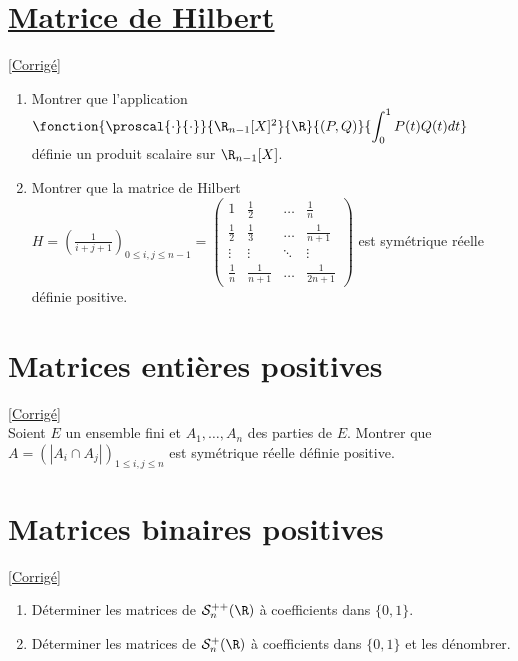 \documentclass[8pt]{book}
\begin{document}
\section{\underline{Matrice de Hilbert} }
\label{Matrice de Hilbert}
\textcolor{blue}{\hyperref[Matrice de Hilbert corrigé]{[Corrigé]}}\\
\begin{enumerate}
	\item Montrer que l'application $\fonction{\proscal{\cdot}{\cdot}}{\R_{n-1}[X]^2}{\R}{(P,Q)}{\displaystyle\int_0^1P(t)Q(t)dt}$ définie un produit scalaire sur $\R_{n-1}[X]$.
	\item Montrer que la matrice de Hilbert $H=\displaystyle\left(\frac{1}{i+j+1}\right)_{0\leq i,j\leq n-1}=
	\begin{pmatrix}
		1&\displaystyle\frac{1}{2}&\dots&\displaystyle\frac{1}{n}\\
		\displaystyle\frac{1}{2}&\displaystyle\frac{1}{3}&\dots&\displaystyle\frac{1}{n+1}\\
		\vdots&\vdots&\ddots&\vdots\\
		\displaystyle\frac{1}{n}&\displaystyle\frac{1}{n+1}&\dots&\displaystyle\frac{1}{2n+1}
	\end{pmatrix}$
	est symétrique réelle définie positive.\\
\end{enumerate}

\section{Matrices entières positives }
\label{Matrices entières positives}
\textcolor{blue}{\hyperref[Matrices entières positives corrigé]{[Corrigé]}}\\
Soient $E$ un ensemble fini et $A_1,\dots,A_n$ des parties de $E$. Montrer que $A=(|A_i\cap A_j|)_{1\leq i,j\leq n}$ est symétrique réelle définie positive.

\section{Matrices binaires positives}
\label{Matrices binaires positives}
\textcolor{blue}{\hyperref[Matrices binaires positives corrigé]{[Corrigé]}}\\
\begin{enumerate}[leftmargin=*]
	\item Déterminer les matrices de $\mathcal S_n^{++}(\R)$ à coefficients dans $\{0,1\}$.
	\item Déterminer les matrices de $\mathcal S_n^+(\R)$ à coefficients dans $\{0,1\}$ et les dénombrer.
\end{enumerate}
\end{document}
